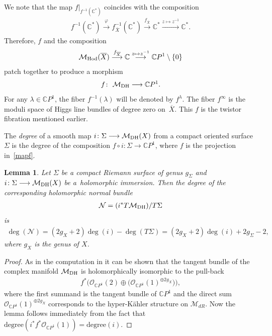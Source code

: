 \documentclass[pdftex]{sigma}
\numberwithin{equation}{section}
\newtheorem{Lemma}[Theorem]{Lemma}
\begin{document}
We note that the map $f\vert_{f^{-1}({\mathbb C}^*)}$ coincides with the composition
\begin{gather*}
f^{-1}({\mathbb C}^*) \stackrel{\varphi}{\longrightarrow} f^{-1}_{\overline X}({\mathbb C}^*) \stackrel{f_{\overline X}}{\longrightarrow}
 {\mathbb C}^* \stackrel{z\mapsto z^{-1}}{\longrightarrow} {\mathbb C}^* .
\end{gather*}
Therefore, $f$ and the composition
\begin{gather*}
\mathcal M_{\rm Hod}(\overline{X}) \stackrel{f_{\overline X}}{\longrightarrow}  {\mathbb C} \stackrel{z\mapsto z^{-1}}{\longrightarrow}
{\mathbb C}P^1\setminus\{0\}
\end{gather*}
patch together to produce a morphism
\begin{gather}\label{mapf}
f \colon \ {\mathcal M}_{\rm DH} \longrightarrow \mathbb CP^1 .
\end{gather}
For any $\lambda \in \mathbb CP^1$, the f\/iber $f^{-1}(\lambda)$ will be denoted by $f^\lambda$. The f\/iber $f^{\infty}$ is the moduli space of Higgs line bundles of degree zero on~$\overline X$. This $f$ is the twistor f\/ibration mentioned earlier.

\begin{Definition} The {\it degree} of a smooth map $i \colon \Sigma \longrightarrow {\mathcal M}_{\rm DH}(X)$ from a compact oriented surface $\Sigma$ is the degree of the composition $f\circ i \colon \Sigma \longrightarrow {\mathbb C}P^1$, where $f$ is the projection in~\eqref{mapf}.
\end{Definition}

\begin{Lemma}\label{lemdeg} Let $\Sigma$ be a compact Riemann surface of genus $g_\Sigma$ and $i \colon \Sigma \longrightarrow {\mathcal M}_{\rm DH}(X)$ be a~holomorphic immersion. Then the degree of the corresponding holomorphic normal bundle \begin{gather*}{\mathcal N} = (i^*T{\mathcal
M}_{\rm DH})/T\Sigma\end{gather*} is
\begin{gather*}
\deg ({\mathcal N}) = (2 g_X +2)\deg (i)-\deg (T\Sigma) = (2 g_X +2)\deg (i) +2g_\Sigma-2 ,\end{gather*}
where $g_X$ is the genus of $X$.
\end{Lemma}

\begin{proof} As in the computation in \cite[pp.~555--556]{HKLR} it can be shown that the tangent bundle of the complex manifold ${\mathcal M}_{\rm DH}$ is holomorphically isomorphic to the pull-back
\begin{gather*}f^*\big({\mathcal O}_{{\mathbb C}P^1}(2)\oplus \big({\mathcal O}_{{\mathbb C}P^1}(1)^{\oplus 2g_X}\big)\big) ,\end{gather*}
where the f\/irst summand is the tangent bundle of $\mathbb CP^1$ and the direct sum ${\mathcal O}_{{\mathbb C}P^1}(1)^{\oplus 2g_X}$ corresponds to the hyper-K\"ahler structure on $\mathcal M_{dR}$. Now the lemma follows immediately from the fact that $\text{degree}(i^*f^*{\mathcal O}_{{\mathbb
C}P^1}(1)) = \text{degree}(i)$.
\end{proof}
\end{document}
